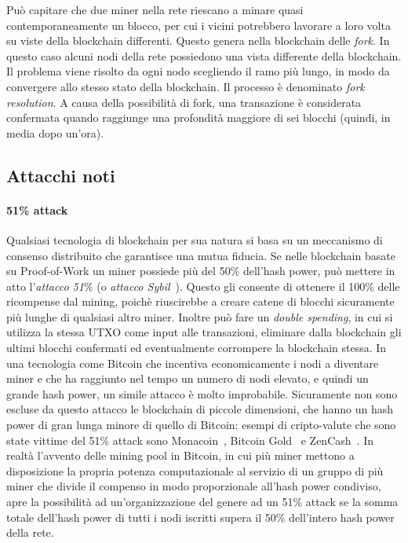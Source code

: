Può capitare che due miner nella rete riescano a minare quasi contemporaneamente un blocco, per cui i vicini potrebbero lavorare a loro volta su viste della blockchain differenti. Questo genera nella blockchain delle \emph{fork}. In questo caso alcuni nodi della rete possiedono una vista differente della blockchain. Il problema viene risolto da ogni nodo scegliendo il ramo più lungo, in modo da convergere allo stesso stato della blockchain. Il processo è denominato \emph{fork resolution}. A causa della possibilità di fork, una transazione è considerata confermata quando raggiunge una profondità maggiore di sei blocchi (quindi, in media dopo un'ora).


\subsection{Attacchi noti}\label{attacks}

\paragraph{51\% attack}
Qualsiasi tecnologia di blockchain per sua natura si basa su un meccanismo di consenso distribuito che garantisce una mutua fiducia. Se nelle blockchain basate su Proof-of-Work un miner possiede più del 50\% dell'hash power, può mettere in atto l'\textit{attacco 51}\% (o \emph{attacco Sybil}~\cite{douceur2002sybil}). Questo gli consente di ottenere il 100\% delle ricompense dal mining, poichè riuscirebbe a creare catene di blocchi sicuramente più lunghe di qualsiasi altro miner. Inoltre può fare un \emph{double spending}, in cui si utilizza la stessa UTXO come input alle transazioni, eliminare dalla blockchain gli ultimi blocchi confermati ed eventualmente corrompere la blockchain stessa.
In una tecnologia come Bitcoin che incentiva economicamente i nodi a diventare miner e che ha raggiunto nel tempo un numero di nodi elevato, e quindi un grande hash power, un simile attacco è molto improbabile. Sicuramente non sono escluse da questo attacco le blockchain di piccole dimensioni, che hanno un hash power di gran lunga minore di quello di Bitcoin: esempi di cripto-valute che sono state vittime del 51\% attack sono Monacoin~\cite{monacoin2018attack}, Bitcoin Gold~\cite{bitcoingold2020attack} e ZenCash~\cite{zencash2020attack}.
In realtà l'avvento delle mining pool in Bitcoin, in cui più miner mettono a disposizione la propria potenza computazionale al servizio di un gruppo di più miner che divide il compenso in modo proporzionale all'hash power condiviso, apre la possibilità ad un'organizzazione del genere ad un 51\% attack se la somma totale dell'hash power di tutti i nodi iscritti supera il 50\% dell'intero hash power della rete.

